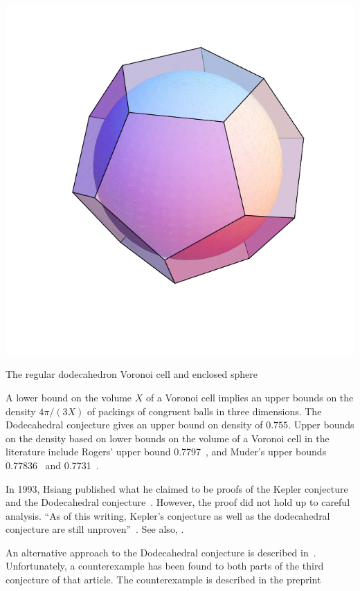\documentclass{article} %
\begin{document}
\begin{Figure}[htb]
  \begin{center}
    \includegraphics[scale=0.40]{images/dodec-sphere.pdf}
   \end{center}
  \caption{The regular dodecahedron Voronoi cell and enclosed sphere}
  \label{fig:dod}
\end{Figure}

A lower bound on the volume $X$ of a Voronoi cell implies
an upper bounds on the density $4\pi/(3X)$ of packings of congruent balls
in three dimensions. The Dodecahedral conjecture gives an upper
bound on density of $0.755$.  
Upper bounds on the density based on lower bounds on the volume of a Voronoi cell
in the literature include Rogers' upper bound 0.7797~\cite{Rogers:1958:Packing}, and Muder's upper 
bounds 0.77836~\cite{Muder:1988:Voronoi} and 0.7731~\cite{Muder:1993:Bound}.

In 1993, Hsiang published what he claimed to be proofs of the Kepler
conjecture and the Dodecahedral conjecture~\cite{Hsiang:1993:IJM}.
However, the proof did not hold up to careful analysis.  ``As of this
writing, Kepler's conjecture as well as the dodecahedral conjecture
are still unproven''~\cite[p761]{Bezdek:1997:IJM}.  See also, \cite{Hales:1994:MI}.

An alternative approach to the Dodecahedral conjecture is described
in~\cite{Bezdek:1997:IJM}.  Unfortunately, a counterexample has been found to
both parts of the third conjecture of that article.  The counterexample
is described in the preprint~\cite{Hales:2002:Dodec}
\end{document}
